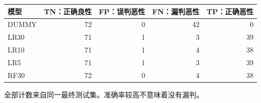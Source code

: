 \begin{center}
\small
\setlength{\tabcolsep}{5pt}
\renewcommand{\arraystretch}{1.25}
\begin{tabular}{lrrrr}
\toprule
模型 & TN：正确良性 & FP：误判恶性 & FN：漏判恶性 & TP：正确恶性 \tabularnewline
\midrule
DUMMY & 72 & 0 & 42 & 0 \tabularnewline
LR30 & 71 & 1 & 3 & 39 \tabularnewline
LR10 & 71 & 1 & 4 & 38 \tabularnewline
LR5 & 71 & 1 & 3 & 39 \tabularnewline
RF30 & 72 & 0 & 4 & 38 \tabularnewline
\bottomrule
\end{tabular}
\end{center}
{\footnotesize 全部计数来自同一最终测试集。准确率较高不意味着没有漏判。}

